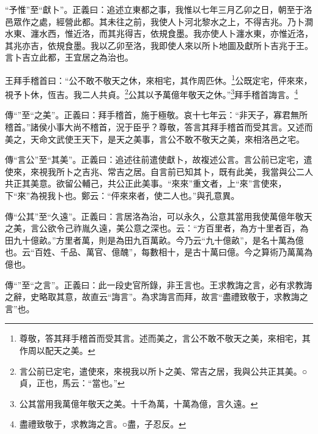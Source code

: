 {\noindent\shu{}\fzkt “予惟”至“獻卜”。正義曰：追述立東都之事，我惟以七年三月乙卯之日，朝至于洛邑眾作之處，經營此都。其未往之前，我使人卜河北黎水之上，不得吉兆。乃卜澗水東、瀍水西，惟近洛，而其兆得吉，依規食墨。我亦使人卜瀍水東，亦惟近洛，其兆亦吉，依規食墨。我以乙卯至洛，我即使人來以所卜地圖及獻所卜吉兆于王。言卜吉立此都，王宜居之為治也。 \par}

王拜手稽首曰：“公不敢不敬天之休，來相宅，其作周匹休。\footnote{尊敬，答其拜手稽首而受其言。述而美之，言公不敢不敬天之美，來相宅，其作周以配天之美。}公既定宅，伻來來，視予卜休，恆吉。我二人共貞。\footnote{言公前已定宅，遣使來，來視我以所卜之美、常吉之居，我與公共正其美。○貞，正也，馬云：“當也。”}公其以予萬億年敬天之休。”\footnote{公其當用我萬億年敬天之美。十千為萬，十萬為億，言久遠。}拜手稽首誨言。\footnote{盡禮致敬于，求教誨之言。○盡，子忍反。}


{\noindent\zhuan{}\fzbyks 傳“”至“之美”。正義曰：拜手稽首，施于極敬。哀十七年云：“非天子，寡君無所稽首。”諸侯小事大尚不稽首，況于臣乎？尊敬，答言其拜手稽首而受其言。又述而美之，天命文武使王天下，是天之美事，言公不敢不敬天之美，來相洛邑之宅。 \par}

{\noindent\zhuan{}\fzbyks 傳“言公”至“其美”。正義曰：追述往前遣使獻卜，故複述公言。言公前已定宅，遣使來，來視我所卜之吉兆、常吉之居。自言前已知其卜，既有此美，我當與公二人共正其美意。欲留公輔己，共公正此美事。“來來”重文者，上“來”言使來，下“來”為視我卜也。鄭云：“伻來來者，使二人也。”與孔意異。 \par}

{\noindent\zhuan{}\fzbyks 傳“公其”至“久遠”。正義曰：言居洛為治，可以永久，公意其當用我使萬億年敬天之美，言公欲令己祚胤久遠，美公意之深也。云：“方百里者，為方十里者百，為田九十億畝。”方里者萬，則是為田九百萬畝。今乃云“九十億畝”，是名十萬為億也。云“百姓、千品、萬官、億醜”，每數相十，是古十萬曰億。今之算術乃萬萬為億也。 \par}

{\noindent\zhuan{}\fzbyks 傳“”至“之言”。正義曰：此一段史官所錄，非王言也。王求教誨之言，必有求教誨之辭，史略取其意，故直云“誨言”。為求誨言而拜，故言“盡禮致敬于，求教誨之言”也。 \par}

